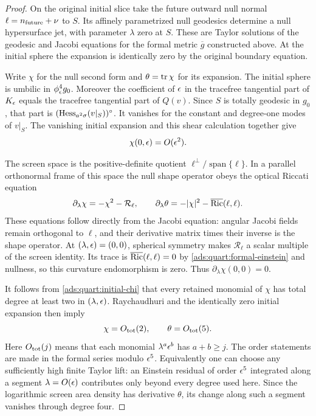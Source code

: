 \begin{proof}
On the original initial slice take the future outward null normal
\(\ell=n_{\rm future}+\nu\) to \(S\).  Its affinely parametrized
null geodesics determine a null hypersurface jet, with parameter
\(\lambda\) zero at \(S\).  These are Taylor solutions of the
geodesic and Jacobi equations for the formal metric
\(\overline g\) constructed above.  At the initial sphere the
expansion is identically zero by the original boundary equation.

Write \(\chi\) for the null second form and \(\theta=\operatorname{tr}\chi\)
for its expansion.  The initial sphere is umbilic in
\(\phi_\epsilon^4g_0\). Moreover the coefficient of \(\epsilon\) in the
tracefree tangential part of \(K_\epsilon\) equals the tracefree tangential
part of \(Q(v)\).
Since \(S\) is totally geodesic in \(g_0\), that part is
\((\operatorname{Hess}_{a^2\sigma}(v|_S))^{\circ}\).  It vanishes for the constant
and degree-one modes of \(v|_S\).  The vanishing initial expansion
and this shear calculation together give
\begin{equation}
 \chi(0,\epsilon)=O(\epsilon^2).
 \label{ads:quart:initial-chi}
\end{equation}

The screen space is the positive-definite quotient
\(\ell^\perp/\operatorname{span}\{\ell\}\). In a parallel orthonormal
frame of this space the null shape operator obeys the optical Riccati
equation
\[
 \partial_\lambda\chi=-\chi^2-\mathcal R_\ell,
 \qquad
 \partial_\lambda\theta
       =-|\chi|^2-\overline{\operatorname{Ric}}(\ell,\ell).
\]
These equations follow directly from the Jacobi equation: angular
Jacobi fields remain orthogonal to \(\ell\), and their derivative
matrix times their inverse is the shape operator.  At
\((\lambda,\epsilon)=(0,0)\), spherical symmetry makes
\(\mathcal R_\ell\) a scalar multiple of the screen identity.
Its trace is \(\overline{\operatorname{Ric}}(\ell,\ell)=0\) by
\eqref{ads:quart:formal-einstein} and nullness, so this curvature
endomorphism is zero.  Thus
\(\partial_\lambda\chi(0,0)=0\).

It follows from \eqref{ads:quart:initial-chi} that every retained monomial
of \(\chi\) has total degree at least two in \((\lambda,\epsilon)\).
Raychaudhuri and the identically zero initial expansion then imply
\begin{equation}
 \chi=O_{\rm tot}(2),\qquad
 \theta=O_{\rm tot}(5).
 \label{ads:quart:optical-orders}
\end{equation}
Here $O_{\rm tot}(j)$ means that each monomial $\lambda^a\epsilon^b$
has $a+b\geq j$. The order statements are made in the formal series modulo
\(\epsilon^5\).  Equivalently one can choose any sufficiently high
finite Taylor lift: an Einstein residual of order \(\epsilon^5\)
integrated along a segment \(\lambda=O(\epsilon)\) contributes only
beyond every degree used here.  Since the logarithmic screen area
density has derivative \(\theta\), its change along such a segment
vanishes through degree four.


\end{proof}
